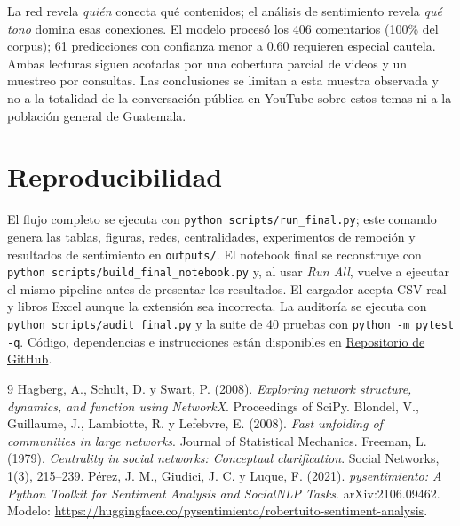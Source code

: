 \documentclass[11pt]{article}
\newcommand{\repo}{\href{https://github.com/DanielBarillasM/Laboratorio-6.-Analitica-de-Redes-Sociales_Grupo-1_DS_Sec-10}{Repositorio de GitHub}}
\begin{document}
La red revela \emph{quién} conecta qué contenidos; el análisis de sentimiento revela \emph{qué tono} domina esas conexiones. El modelo procesó los 406 comentarios (100\% del corpus); 61 predicciones con confianza menor a 0.60 requieren especial cautela. Ambas lecturas siguen acotadas por una cobertura parcial de videos y un muestreo por consultas. Las conclusiones se limitan a esta muestra observada y no a la totalidad de la conversación pública en YouTube sobre estos temas ni a la población general de Guatemala.

\section{Reproducibilidad}

El flujo completo se ejecuta con \texttt{python scripts/run\_final.py}; este comando genera las tablas, figuras, redes, centralidades, experimentos de remoción y resultados de sentimiento en \texttt{outputs/}. El notebook final se reconstruye con \texttt{python scripts/build\_final\_notebook.py} y, al usar \emph{Run All}, vuelve a ejecutar el mismo pipeline antes de presentar los resultados. El cargador acepta CSV real y libros Excel aunque la extensión sea incorrecta. La auditoría se ejecuta con \texttt{python scripts/audit\_final.py} y la suite de 40 pruebas con \texttt{python -m pytest -q}. Código, dependencias e instrucciones están disponibles en \repo.

\begin{thebibliography}{9}
 Hagberg, A., Schult, D. y Swart, P. (2008). \emph{Exploring network structure, dynamics, and function using NetworkX}. Proceedings of SciPy.
 Blondel, V., Guillaume, J., Lambiotte, R. y Lefebvre, E. (2008). \emph{Fast unfolding of communities in large networks}. Journal of Statistical Mechanics.
 Freeman, L. (1979). \emph{Centrality in social networks: Conceptual clarification}. Social Networks, 1(3), 215--239.
 Pérez, J. M., Giudici, J. C. y Luque, F. (2021). \emph{pysentimiento: A Python Toolkit for Sentiment Analysis and SocialNLP Tasks}. arXiv:2106.09462. Modelo: \url{https://huggingface.co/pysentimiento/robertuito-sentiment-analysis}.
\end{thebibliography}
\end{document}
